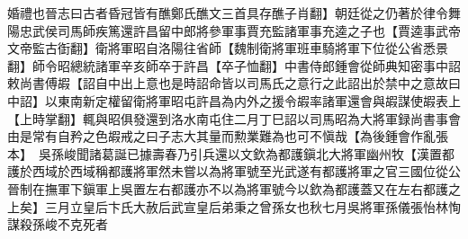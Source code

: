 婚禮也晉志曰古者昏冠皆有醮鄭氏醮文三首具存醮子肖翻】朝廷從之仍著於律令舞陽忠武侯司馬師疾篤還許昌留中郎將參軍事賈充監諸軍事充逵之子也【賈逵事武帝文帝監古衘翻】衛將軍昭自洛陽往省師【魏制衛將軍班車騎將軍下位從公省悉景翻】師令昭總統諸軍辛亥師卒于許昌【卒子恤翻】中書侍郎鍾會從師典知密事中詔敕尚書傅嘏【詔自中出上意也是時詔命皆以司馬氏之意行之此詔出於禁中之意故曰中詔】以東南新定權留衛將軍昭屯許昌為内外之援令嘏率諸軍還會與嘏謀使嘏表上【上時掌翻】輒與昭俱發還到洛水南屯住二月丁巳詔以司馬昭為大將軍録尚書事會由是常有自矜之色嘏戒之曰子志大其量而勲業難為也可不愼哉【為後鍾會作亂張本】　吳孫峻聞諸葛誕已據壽春乃引兵還以文欽為都護鎭北大將軍幽州牧【漢置都護於西域於西域稱都護將軍然未嘗以為將軍號至光武遂有都護將軍之官三國位從公晉制在撫軍下鎭軍上吳置左右都護亦不以為將軍號今以欽為都護蓋又在左右都護之上矣】三月立皇后卞氏大赦后武宣皇后弟秉之曾孫女也秋七月吳將軍孫儀張怡林恂謀殺孫峻不克死者

